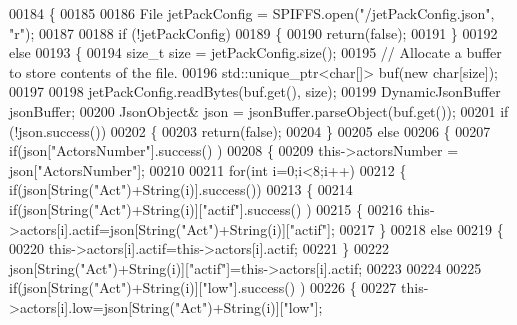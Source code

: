 \begin{DoxyCode}
00184 \{
00185 
00186     File jetPackConfig = SPIFFS.open(\textcolor{stringliteral}{"/jetPackConfig.json"}, \textcolor{stringliteral}{"r"});
00187 
00188     \textcolor{keywordflow}{if} (!jetPackConfig) 
00189     \{
00190         \textcolor{keywordflow}{return}(\textcolor{keyword}{false});
00191     \}
00192     \textcolor{keywordflow}{else}
00193     \{
00194         \textcolor{keywordtype}{size\_t} size = jetPackConfig.size();
00195         \textcolor{comment}{// Allocate a buffer to store contents of the file.}
00196         std::unique\_ptr<char[]> buf(\textcolor{keyword}{new} \textcolor{keywordtype}{char}[size]);
00197 
00198         jetPackConfig.readBytes(buf.get(), size);
00199         DynamicJsonBuffer jsonBuffer;
00200         JsonObject& json = jsonBuffer.parseObject(buf.get());
00201         \textcolor{keywordflow}{if} (!json.success()) 
00202         \{
00203               \textcolor{keywordflow}{return}(\textcolor{keyword}{false});
00204         \} 
00205         \textcolor{keywordflow}{else}
00206         \{     
00207             \textcolor{keywordflow}{if}(json[\textcolor{stringliteral}{"ActorsNumber"}].success() )
00208             \{
00209                 this->actorsNumber = json[\textcolor{stringliteral}{"ActorsNumber"}]; 
00210             
00211                 \textcolor{keywordflow}{for}(\textcolor{keywordtype}{int} i=0;i<8;i++)
00212                 \{   \textcolor{keywordflow}{if}(json[String(\textcolor{stringliteral}{"Act"})+String(i)].success())
00213                     \{
00214                         \textcolor{keywordflow}{if}(json[String(\textcolor{stringliteral}{"Act"})+String(i)][\textcolor{stringliteral}{"actif"}].success() )
00215                         \{
00216                             this->actors[i].actif=json[String(\textcolor{stringliteral}{"Act"})+String(i)][\textcolor{stringliteral}{"actif"}];
00217                         \}
00218                         \textcolor{keywordflow}{else}
00219                         \{
00220                             this->actors[i].actif=this->actors[i].actif;
00221                         \}
00222                         json[String(\textcolor{stringliteral}{"Act"})+String(i)][\textcolor{stringliteral}{"actif"}]=this->actors[i].actif;
00223 
00224 
00225                         \textcolor{keywordflow}{if}(json[String(\textcolor{stringliteral}{"Act"})+String(i)][\textcolor{stringliteral}{"low"}].success() )
00226                         \{                   
00227                             this->actors[i].low=json[String(\textcolor{stringliteral}{"Act"})+String(i)][\textcolor{stringliteral}{"low"}];

\end{DoxyCode}
